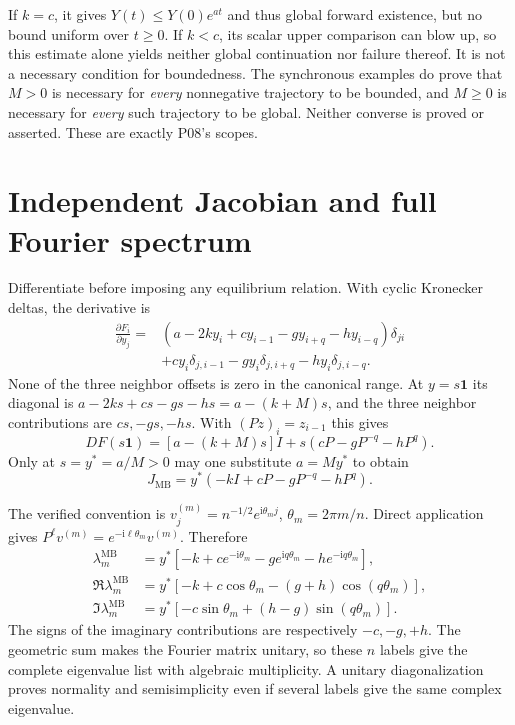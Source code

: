 \documentclass[11pt]{article}
\newcommand{\one}{\mathbf 1}
\newcommand{\MB}{\mathrm{MB}}
\begin{document}
If $k=c$, it gives $Y(t)\le Y(0)e^{at}$ and thus global forward
existence, but no bound uniform over $t\ge0$. If $k<c$, its scalar
upper comparison can blow up, so this estimate alone yields neither
global continuation nor failure thereof. It is not a necessary
condition for boundedness. The synchronous examples do prove that
$M>0$ is necessary for \emph{every} nonnegative trajectory to be bounded,
and $M\ge0$ is necessary for \emph{every} such trajectory to be global.
Neither converse is proved or asserted. These are exactly P08's scopes.

\section{Independent Jacobian and full Fourier spectrum}
Differentiate before imposing any equilibrium relation. With cyclic
Kronecker deltas, the derivative is
\begin{align*}
 \frac{\partial F_i}{\partial y_j}
 ={}&(a-2ky_i+cy_{i-1}-gy_{i+q}-hy_{i-q})\delta_{ji}\\
 &+cy_i\delta_{j,i-1}-gy_i\delta_{j,i+q}-hy_i\delta_{j,i-q}.
\end{align*}
None of the three neighbor offsets is zero in the canonical range.
At $y=s\one$ its diagonal is
$a-2ks+cs-gs-hs=a-(k+M)s$, and the three neighbor contributions
are $cs,-gs,-hs$. With $(Pz)_i=z_{i-1}$ this gives
\[
 DF(s\one)=[a-(k+M)s]I+s(cP-gP^{-q}-hP^q).
\]
Only at $s=y^*=a/M>0$ may one substitute $a=My^*$ to obtain
\[
 J_{\MB}=y^*(-kI+cP-gP^{-q}-hP^q).
\]

The verified convention is $v^{(m)}_j=n^{-1/2}e^{\mathrm i\theta_m j}$,
$\theta_m=2\pi m/n$. Direct application gives
$P^\ell v^{(m)}=e^{-\mathrm i\ell\theta_m}v^{(m)}$. Therefore
\begin{align*}
 \lambda_m^{\MB}&=y^*[-k+ce^{-\mathrm i\theta_m}
                         -ge^{\mathrm i q\theta_m}-he^{-\mathrm i q\theta_m}],\\
 \Re\lambda_m^{\MB}&=y^*[-k+c\cos\theta_m-(g+h)\cos(q\theta_m)],\\
 \Im\lambda_m^{\MB}&=y^*[-c\sin\theta_m+(h-g)\sin(q\theta_m)].
\end{align*}
The signs of the imaginary contributions are respectively $-c,-g,+h$.
The geometric sum makes the Fourier matrix unitary, so these $n$ labels
give the complete eigenvalue list with algebraic multiplicity. A unitary
diagonalization proves normality and semisimplicity even if several
labels give the same complex eigenvalue.
\end{document}
